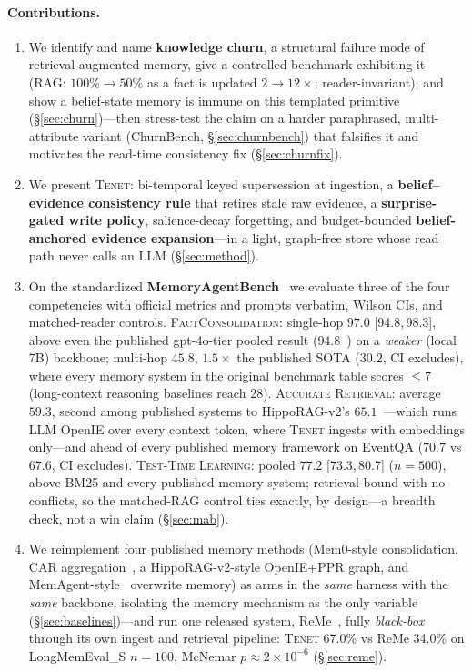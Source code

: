 \documentclass[11pt]{article}
\newcommand{\tenet}{\textsc{Tenet}}
\newcommand{\ci}[2]{{\footnotesize[#1,\,#2]}}
\begin{document}
\paragraph{Contributions.}
\begin{enumerate}
\item We identify and name \textbf{knowledge churn}, a structural failure mode of
  retrieval-augmented memory, give a controlled benchmark exhibiting it (RAG:
  $100\%\!\to\!50\%$ as a fact is updated $2\!\to\!12\times$; reader-invariant), and show
  a belief-state memory is immune on this templated primitive (\S\ref{sec:churn})---then
  stress-test the claim on a harder paraphrased, multi-attribute variant (ChurnBench,
  \S\ref{sec:churnbench}) that falsifies it and motivates the read-time consistency fix
  (\S\ref{sec:churnfix}).
\item We present \tenet{}: bi-temporal keyed supersession at ingestion, a
  \textbf{belief--evidence consistency rule} that retires stale raw evidence, a
  \textbf{surprise-gated write policy}, salience-decay forgetting, and budget-bounded
  \textbf{belief-anchored evidence expansion}---in a light, graph-free store whose read
  path never calls an LLM (\S\ref{sec:method}).
\item On the standardized \textbf{MemoryAgentBench}~\cite{mab} we evaluate three of the
  four competencies with official metrics and prompts verbatim, Wilson CIs, and matched-reader
  controls. \textsc{FactConsolidation}: single-hop $97.0$ \ci{94.8}{98.3}, above even the
  published gpt-4o-tier pooled result ($94.8$~\cite{freshness}) on a \emph{weaker}
  (local 7B) backbone; multi-hop $45.8$, $1.5\times$ the published SOTA ($30.2$, CI
  excludes), where every memory system in the
  original benchmark table scores $\le 7$ (long-context reasoning baselines reach 28). \textsc{Accurate Retrieval}: average $59.3$,
  second among published systems to HippoRAG-v2's $65.1$~\cite{hipporag2}---which runs
  LLM OpenIE over every context token, where \tenet{} ingests with embeddings
  only---and ahead of every published memory framework on EventQA ($70.7$ vs $67.6$, CI excludes).
  \textsc{Test-Time Learning}: pooled $77.2$ \ci{73.3}{80.7} ($n{=}500$), above BM25
  and every published memory system; retrieval-bound with no conflicts, so the
  matched-RAG control ties exactly, by design---a breadth check, not a win claim
  (\S\ref{sec:mab}).
\item We reimplement four published memory methods (Mem0-style consolidation, CAR
  aggregation~\cite{freshness}, a HippoRAG-v2-style OpenIE+PPR graph, and
  MemAgent-style~\cite{memagent} overwrite memory) as arms in the \emph{same} harness with
  the \emph{same} backbone, isolating the memory mechanism as the only variable
  (\S\ref{sec:baselines})---and run one released system, ReMe~\cite{reme}, fully
  \emph{black-box} through its own ingest and retrieval pipeline: \tenet{} 67.0\% vs
  ReMe 34.0\% on LongMemEval\_S $n{=}100$, McNemar $p\approx2\times10^{-6}$
  (\S\ref{sec:reme}).
\end{enumerate}
\end{document}
